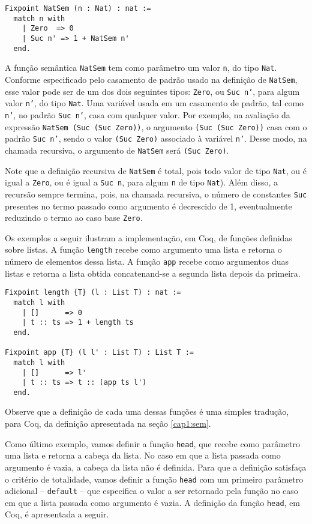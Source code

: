 \begin{lstlisting}
Fixpoint NatSem (n : Nat) : nat :=
  match n with
    | Zero  => 0
    | Suc n' => 1 + NatSem n'
  end.
\end{lstlisting}

A função semântica \texttt{NatSem} tem como parâmetro um valor \texttt{n}, do tipo \texttt{Nat}. Conforme especificado pelo casamento de padrão usado na definição de \texttt{NatSem}, esse valor pode ser de um dos dois seguintes tipos: \texttt{Zero}, ou \texttt{Suc n'}, para algum valor \texttt{n'}, do tipo \texttt{Nat}. Uma variável usada em um casamento de padrão, tal como \texttt{n'}, no padrão \texttt{Suc n'}, casa com qualquer valor. Por exemplo, na avaliação da expressão \texttt{NatSem (Suc (Suc Zero))}, o argumento \texttt{(Suc (Suc Zero))} casa com o padrão \texttt{Suc n'}, sendo o valor \texttt{(Suc Zero)} associado à variável \texttt{n'}. Desse modo, na chamada recursiva, o argumento de \texttt{NatSem} será \texttt{(Suc Zero)}. 

Note que a definição recursiva de \texttt{NatSem} \'e total, pois todo valor de tipo \texttt{Nat}, ou \'e igual a \texttt{Zero}, ou é igual a \texttt{Suc n}, para algum \texttt{n} de tipo \texttt{Nat}). Além disso, a recursão sempre termina, pois, na chamada recursiva, o  n\'umero de constantes \texttt{Suc} presentes no termo passado como argumento é decrescido de 1, eventualmente reduzindo o termo ao caso base \texttt{Zero}.

Os exemplos a seguir ilustram a implementação, em Coq, de funções definidas sobre listas. A função \texttt{length} recebe como argumento uma lista e retorna o número de elementos dessa lista. A função \texttt{app} recebe como argumentos duas listas e retorna a lista obtida concatenand-se a segunda lista depois da primeira. 

\begin{lstlisting}
Fixpoint length {T} (l : List T) : nat :=
  match l with
    | []      => 0
    | t :: ts => 1 + length ts
  end.

Fixpoint app {T} (l l' : List T) : List T :=
  match l with
    | []      => l'
    | t :: ts => t :: (app ts l')
  end.
\end{lstlisting}

Observe que a defini\c{c}\~ao de cada uma dessas fun\c{c}\~oes é uma simples 
tradu\c{c}\~ao, para Coq, da definição apresentada na se\c{c}\~ao \ref{cap1:sem}.

Como último exemplo, vamos definir a função \texttt{head}, que recebe como parâmetro uma lista e retorna a cabeça da lista. No caso em que a lista passada como argumento é vazia, a cabeça da lista não é definida. Para que a definição satisfaça o critério de totalidade, vamos definir a função \texttt{head} com um primeiro parâmetro adicional -- \texttt{default} -- que especifica o valor a ser retornado pela função no caso em que a lista passada como argumento é vazia. A definição da função \texttt{head}, em Coq, é apresentada a seguir.

